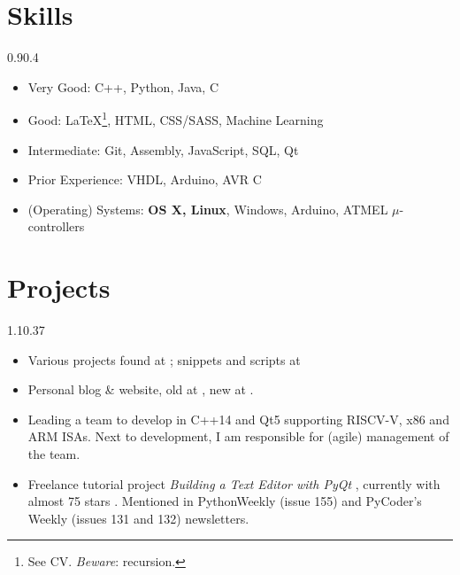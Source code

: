\section{Skills}{0.9}{0.4}
\vspace{-2mm}
\begin{multicols}{2}
	\begin{itemize}
		\item Very Good: C++, Python, Java, C
		\item Good: \LaTeX\footnote{See CV. \emph{Beware}: recursion.}, HTML,
      CSS/SASS, Machine Learning
		\item Intermediate: Git, Assembly, JavaScript, SQL, Qt
		\item Prior Experience: VHDL, Arduino, AVR C
		\item (Operating) Systems: \textbf{OS X, Linux}, Windows, Arduino, ATMEL $\mu$-controllers
    \\
	\end{itemize}
\end{multicols}

\section{Projects}{1.1}{0.37}
\vspace{-5mm}
\begin{itemize}
	\item Various projects found at
	; snippets and scripts at 
	\item Personal blog \& website, old at , new at .
  \item Leading a team to develop  in C++14 and Qt5 supporting RISCV-V, x86 and ARM ISAs. Next to development, I am responsible for (agile) management of the team.
	\item Freelance tutorial project \emph{Building a Text Editor with
      PyQt} , currently with
    almost 75 stars . Mentioned in PythonWeekly (issue 155) and PyCoder's Weekly (issues 131 and 132) newsletters.
\end{itemize}

